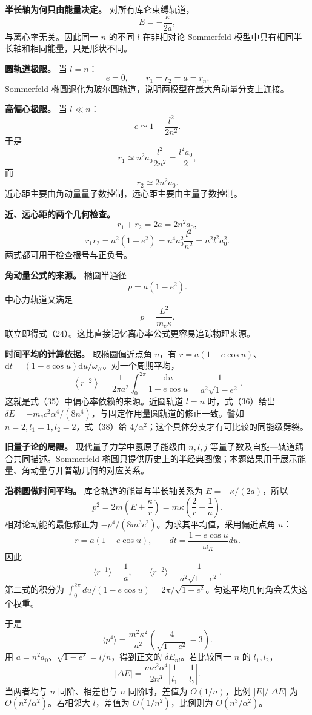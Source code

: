 \documentclass[12pt,a4paper,UTF8]{ctexart}
\begin{document}
\textbf{半长轴为何只由能量决定。} 对所有库仑束缚轨道， \[
E=-\frac{\kappa}{2a}, \tag{41}
\] 与离心率无关。因此同一 \(n\) 的不同 \(l\) 在非相对论 Sommerfeld
模型中具有相同半长轴和相同能量，只是形状不同。

\textbf{圆轨道极限。} 当 \(l=n\)： \[
e=0,\qquad r_1=r_2=a=r_n. \tag{42}
\] Sommerfeld 椭圆退化为玻尔圆轨道，说明两模型在最大角动量分支上连接。

\textbf{高偏心极限。} 当 \(l\ll n\)： \[
e\simeq1-\frac{l^2}{2n^2}. \tag{43}
\] 于是 \[
r_1\simeq n^2a_0\frac{l^2}{2n^2}
=\frac{l^2a_0}{2}, \tag{44}
\] 而 \[
r_2\simeq2n^2a_0. \tag{45}
\] 近心距主要由角动量量子数控制，远心距主要由主量子数控制。

\textbf{近、远心距的两个几何检查。} \[
r_1+r_2=2a=2n^2a_0, \tag{46}
\] \[
r_1r_2=a^2(1-e^2)
=n^4a_0^2\frac{l^2}{n^2}
=n^2l^2a_0^2. \tag{47}
\] 两式都可用于检查根号与正负号。

\textbf{角动量公式的来源。} 椭圆半通径 \[
p=a(1-e^2). \tag{48}
\] 中心力轨道又满足 \[
p=\frac{L^2}{m_e\kappa}. \tag{49}
\] 联立即得式（24）。这比直接记忆离心率公式更容易追踪物理来源。

\textbf{时间平均的计算依据。} 取椭圆偏近点角 \(u\)，有
\(r=a(1-e\cos u)\)、\(\mathrm dt=(1-e\cos u)\mathrm du/\omega_K\)。对一个周期平均，
\[
\left\langle r^{-2}\right\rangle
=\frac1{2\pi a^2}\int_0^{2\pi}\frac{\mathrm du}{1-e\cos u}
=\frac1{a^2\sqrt{1-e^2}}.
\] 这就是式（35）中偏心率依赖的来源。近圆轨道 \(l=n\) 时，式（36）给出
\(\delta E=-m_ec^2\alpha^4/(8n^4)\)，与固定作用量圆轨道的修正一致。譬如
\(n=2,l_1=1,l_2=2\)，式（38）给
\(4/\alpha^2\)；这个具体分支才有可比较的同能级劈裂。

\textbf{旧量子论的局限。} 现代量子力学中氢原子能级由 \(n,l,j\)
等量子数及自旋---轨道耦合共同描述。Sommerfeld
椭圆只提供历史上的半经典图像；本题结果用于展示能量、角动量与开普勒几何的对应关系。

\textbf{沿椭圆做时间平均。} 库仑轨道的能量与半长轴关系为
\(E=-\kappa/(2a)\)，所以 \[
p^2=2m\left(E+\frac\kappa r\right)
=m\kappa\left(\frac2r-\frac1a\right).
\] 相对论动能的最低修正为 \(-p^4/(8m^3c^2)\)。为求其平均值，采用偏近点角
\(u\)： \[
r=a(1-e\cos u),\qquad dt=\frac{1-e\cos u}{\omega_K}du.
\] 因此 \[
\langle r^{-1}\rangle=\frac1a,
\qquad
\langle r^{-2}\rangle=\frac1{a^2\sqrt{1-e^2}}.
\] 第二式的积分为
\(\int_0^{2\pi}du/(1-e\cos u)=2\pi/\sqrt{1-e^2}\)。匀速平均几何角会丢失这个权重。

于是 \[
\langle p^4\rangle=\frac{m^2\kappa^2}{a^2}\left(\frac4{\sqrt{1-e^2}}-3\right).
\] 用 \(a=n^2a_0\)、\(\sqrt{1-e^2}=l/n\)，得到正文的
\(\delta E_{nl}\)。若比较同一 \(n\) 的 \(l_1,l_2\)， \[
|\Delta E|=\frac{mc^2\alpha^4}{2n^3}\left|\frac1{l_1}-\frac1{l_2}\right|.
\] 当两者均与 \(n\) 同阶、相差也与 \(n\) 同阶时，差值为 \(O(1/n)\)，比例
\(|E|/|\Delta E|\) 为 \(O(n^2/\alpha^2)\)。若相邻大 \(l\)，差值为
\(O(1/n^2)\)，比例则为 \(O(n^3/\alpha^2)\)。
\end{document}

